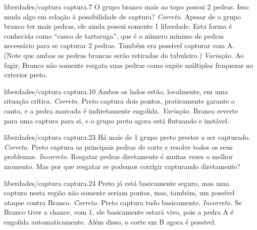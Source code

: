 \problemAnswerDiagram
  {liberdades/captura}
  {captura.7}
  {O grupo branco mais ao topo possui 2 pedras. Isso muda algo em relação à possibilidade de captura?}
  {\emph{Correto.} Apesar de o grupo branco ter mais pedras, ele ainda possui somente 1 liberdade. Esta forma é conhecida como ``casco de tartaruga'', que é o número mínimo de pedras necessário para se capturar 2 pedras. Também era possível capturar com A. (Note que ambas as pedras brancas serão retiradas do tabuleiro.)}
  {\emph{Variação.} Ao fugir, Branco não somente resgata suas pedras como expõe múltiplas fraquezas no exterior preto.}

\problemAnswerDiagram
  {liberdades/captura}
  {captura.10}
  {Ambos os lados estão, localmente, em uma situação crítica.}
  {\emph{Correto.} Preto captura dois pontos, praticamente garante o canto, e a pedra marcada é indiretamente engolida.}
  {\emph{Variação.} Branco reverte para uma captura para si, e o grupo preto agora está flutuando e instável.}

\problemAnswerDiagram
  {liberdades/captura}
  {captura.23}
  {Há mais de 1 grupo preto prestes a ser capturado.}
  {\emph{Correto.} Preto captura as principais pedras de corte e resolve todos os seus problemas.}
  {\emph{Incorreto.} Resgatar pedras diretamente é muitas vezes o melhor momento. Mas por que resgatar se podemos corrigir capturando diretamente?}

\problemAnswerDiagram
  {liberdades/captura}
  {captura.24}
  {Preto já está basicamente seguro, mas uma captura nesta região não somente seriam pontos, mas, também, um possível ataque contra Branco.}
  {\emph{Correto.} Preto captura tudo basicamente.}
  {\emph{Incorreto.} Se Branco tiver a chance, com 1, ele basicamente estará vivo, pois a pedra A é engolida automaticamente. Além disso, o corte em B agora é possível.}

\clearedpage
\clearedpage







